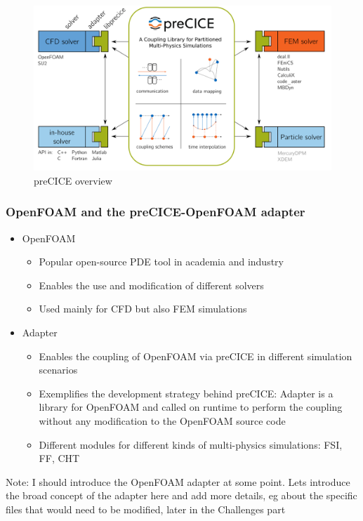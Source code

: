 \begin{figure}[t]
	\centering
	\includegraphics[width=0.9 \textwidth]{images/precice-overview.png}
	\caption{preCICE overview \cite{Chourdakis:2022}}
	\label{fig:precice:overview}
\end{figure}


\subsubsection{OpenFOAM and the preCICE-OpenFOAM adapter}
\begin{itemize}
	\item OpenFOAM
	\begin{itemize}
		\item Popular open-source PDE tool in academia and industry
		\item Enables the use and modification of different solvers
		\item Used mainly for CFD but also FEM simulations 
	\end{itemize}
	\item Adapter
	\begin{itemize}
		\item Enables the coupling of OpenFOAM via preCICE in different simulation scenarios
		\item Exemplifies the development strategy behind preCICE: Adapter is a library for OpenFOAM and called on runtime to perform the coupling without any modification to the OpenFOAM source code
		\item Different modules for different kinds of multi-physics simulations: FSI, FF, CHT
	\end{itemize}
\end{itemize}	
Note:
I should introduce the OpenFOAM adapter at some point.
Lets introduce the broad concept of the adapter here and add more details, eg about the specific files that would need to be modified, later in the Challenges part
\newline
